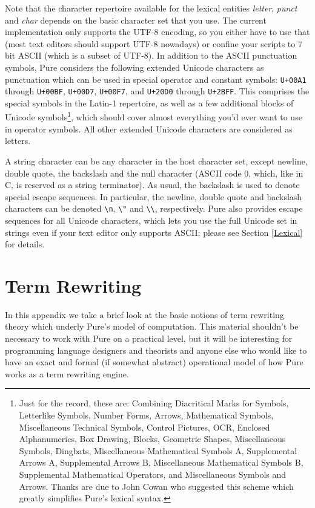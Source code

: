 \documentclass[a4paper,12pt]{article}
\newcommand{\nt}[1]{\textrm{\textit{#1\/}}}
\begin{document}
Note that the character repertoire available for the lexical entities \nt{letter}, \nt{punct} and \nt{char} depends on the basic character set that you use. The current implementation only supports the UTF-8 encoding, so you either have to use that (most text editors should support UTF-8 nowadays) or confine your scripts to 7 bit ASCII (which is a subset of UTF-8). In addition to the ASCII punctuation symbols, Pure considers the following extended Unicode characters as punctuation which can be used in special operator and constant symbols: \verb|U+00A1| through \verb|U+00BF|, \verb|U+00D7|, \verb|U+00F7|, and \verb|U+20D0| through \verb|U+2BFF|. This comprises the special symbols in the Latin-1 repertoire, as well as a few additional blocks of Unicode symbols\footnote{Just for the record, these are: Combining Diacritical Marks for Symbols, Letterlike Symbols, Number Forms, Arrows, Mathematical Symbols, Miscellaneous Technical Symbols, Control Pictures, OCR, Enclosed Alphanumerics, Box Drawing, Blocks, Geometric Shapes, Miscellaneous Symbols, Dingbats, Miscellaneous Mathematical Symbols A, Supplemental Arrows A, Supplemental Arrows B, Miscellaneous Mathematical Symbols B, Supplemental Mathematical Operators, and Miscellaneous Symbols and Arrows. Thanks are due to John Cowan who suggested this scheme which greatly simplifies Pure's lexical syntax.}, which should cover almost everything you'd ever want to use in operator symbols. All other extended Unicode characters are considered as letters.

A string character can be any character in the host character set, except newline, double quote, the backslash and the null character (ASCII code 0, which, like in C, is reserved as a string terminator). As usual, the backslash is used to denote special escape sequences. In particular, the newline, double quote and backslash characters can be denoted \verb|\n|, \verb|\"| and \verb|\\|, respectively. Pure also provides escape sequences for all Unicode characters, which lets you use the full Unicode set in strings even if your text editor only supports ASCII; please see Section \ref{Lexical} for details.

\section{Term Rewriting}
\label{Rewriting}

In this appendix we take a brief look at the basic notions of term rewriting theory which underly Pure's model of computation. This material shouldn't be necessary to work with Pure on a practical level, but it will be interesting for programming language designers and theorists and anyone else who would like to have an exact and formal (if somewhat abstract) operational model of how Pure works as a term rewriting engine.
\end{document}
